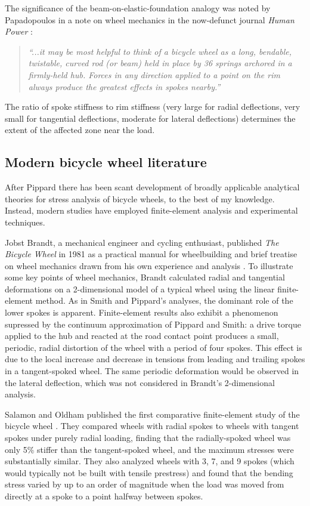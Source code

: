 \documentclass[../thesis.tex]{subfiles}
\begin{document}
The significance of the beam-on-elastic-foundation analogy was noted by Papadopoulos in a note on wheel mechanics in the now-defunct journal \emph{Human Power} \cite{Papadopoulos1986}:

\begin{quote}
\emph{``...it may be most helpful to think of a bicycle wheel as a long, bendable, twistable, curved rod (or beam) held in place by 36 springs archored in a firmly-held hub. Forces in any direction applied to a point on the rim always produce the greatest effects in spokes nearby.''}
\end{quote}

The ratio of spoke stiffness to rim stiffness (very large for radial deflections, very small for tangential deflections, moderate for lateral deflections) determines the extent of the affected zone near the load.

\subsection{Modern bicycle wheel literature}

After Pippard there has been scant development of broadly applicable analytical theories for stress analysis of bicycle wheels, to the best of my knowledge. Instead, modern studies have employed finite-element analysis and experimental techniques.

Jobst Brandt, a mechanical engineer and cycling enthusiast, published \emph{The Bicycle Wheel} in 1981 as a practical manual for wheelbuilding and brief treatise on wheel mechanics drawn from his own experience and analysis \cite{Brandt1993}. To illustrate some key points of wheel mechanics, Brandt calculated radial and tangential deformations on a 2-dimensional model of a typical wheel using the linear finite-element method. As in Smith and Pippard's analyses, the dominant role of the lower spokes is apparent. Finite-element results also exhibit a phenomenon supressed by the continuum approximation of Pippard and Smith: a drive torque applied to the hub and reacted at the road contact point produces a small, periodic, radial distortion of the wheel with a period of four spokes. This effect is due to the local increase and decrease in tensions from leading and trailing spokes in a tangent-spoked wheel. The same periodic deformation would be observed in the lateral deflection, which was not considered in Brandt's 2-dimensional analysis.

Salamon and Oldham published the first comparative finite-element study of the bicycle wheel \cite{Salamon1992}. They compared wheels with radial spokes to wheels with tangent spokes under purely radial loading, finding that the radially-spoked wheel was only 5\% stiffer than the tangent-spoked wheel, and the maximum stresses were substantially similar. They also analyzed wheels with 3, 7, and 9 spokes (which would typically not be built with tensile prestress) and found that the bending stress varied by up to an order of magnitude when the load was moved from directly at a spoke to a point halfway between spokes.
\end{document}
